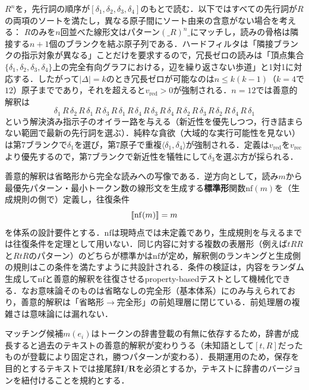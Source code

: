 \documentclass[../../main-detail.tex]{subfiles}
\begin{document}
\begin{example}\label{ex:rn}
    $R^n$を，先行詞の順序が$[\delta_1,\delta_2,\delta_3,\delta_4]$のもとで読む．以下ではすべての先行詞が$R$の両項のソートを満たし，異なる原子間にソート由来の含意がない場合を考える：
    $R$のみを$n$回並べた線形文はパターン$(\_R)^n\_$にマッチし，読みの骨格は隣接する$n+1$個のブランクを結ぶ原子列である．ハードフィルタは「隣接ブランクの指示対象が異なる」ことだけを要求するので，冗長ゼロの読みは「頂点集合$\{\delta_1,\delta_2,\delta_3,\delta_4\}$上の完全有向グラフにおける，辺を繰り返さない歩道」と1対1に対応する．したがって$|\Delta| = k$のとき冗長ゼロが可能なのは$n \leq k(k-1)$（$k=4$で$12$）原子までであり，それを超えると$v_{\mathrm{red}} > 0$が強制される．$n = 12$では善意的解釈は
    \[
        \delta_1\,R\,\delta_2\,R\,\delta_1\,R\,\delta_3\,R\,\delta_1\,R\,\delta_4\,R\,\delta_3\,R\,\delta_4\,R\,\delta_2\,R\,\delta_3\,R\,\delta_2\,R\,\delta_4\,R\,\delta_1
    \]
    という解決済み指示子のオイラー路を与える（新近性を優先しつつ，行き詰まらない範囲で最新の先行詞を選ぶ）．純粋な貪欲（大域的な実行可能性を見ない）は第7ブランクで$\delta_1$を選び，第7原子で重複$\langle \delta_1, \delta_4\rangle$が強制される．定義は$v_{\mathrm{red}}$を$v_{\mathrm{rec}}$より優先するので，第7ブランクで新近性を犠牲にして$\delta_3$を選ぶ方が採られる．
\end{example}

\begin{remark}[往復条件]
    善意的解釈は省略形から完全な読みへの写像である．逆方向として，読み$m$から最優先パターン・最小トークン数の線形文を生成する\textbf{標準形}関数$\mathrm{nf}(m)$を（生成規則の側で）定義し，往復条件
    \[
        \llbracket \mathrm{nf}(m) \rrbracket = m
    \]
    を体系の設計要件とする．$\mathrm{nf}$は現時点では未定義であり，生成規則を与えるまでは往復条件を定理として用いない．同じ内容に対する複数の表層形（例えば$tRR$と$RtR$のパターン）のどちらが標準かは$\mathrm{nf}$が定め，解釈側のランキングと生成側の規則はこの条件を満たすように共設計される．条件の検証は，内容をランダム生成して$\mathrm{nf}$と善意的解釈を往復させるproperty-basedテストとして機械化できる．なお意味論そのものは省略なしの完全形（基本体系）にのみ与えられており，善意的解釈は「省略形$\to$完全形」の前処理層に閉じている．前処理層の複雑さは意味論には漏れない．
\end{remark}

\begin{remark}[非単調性と保存規約]
    マッチング候補$m(e_i)$はトークンの辞書登載の有無に依存するため，辞書が成長すると過去のテキストの善意的解釈が変わりうる（未知語として$[t, R]$だったものが登載により固定され，勝つパターンが変わる）．長期運用のため，保存を目的とするテキストでは接尾辞$\mathbf{I}/\mathbf{R}$を必須とするか，テキストに辞書のバージョンを紐付けることを規約とする．
\end{remark}
\end{document}
